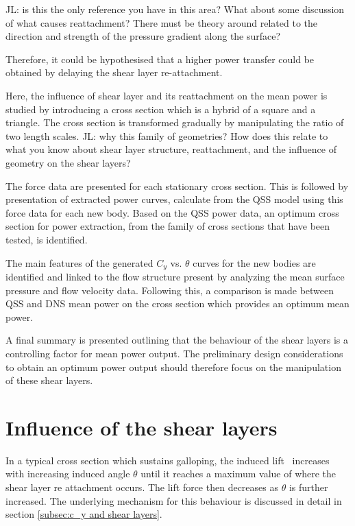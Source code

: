 JL: is this the only reference you have in this area? What about some discussion of what causes reattachment? There must be theory around related to the direction and strength of the pressure gradient along the surface?

Therefore, it could be hypothesised that a higher power transfer could be obtained by delaying the shear layer re-attachment. 

Here, the influence of shear layer and its reattachment on the mean power is studied by introducing a cross section which is a hybrid of a square and a triangle. The cross section is transformed gradually by manipulating the ratio of two length scales. JL: why this family of geometries? How does this relate to what you know about shear layer structure, reattachment, and the influence of geometry on the shear layers?

The force data are presented for each stationary cross section. This is followed by presentation of extracted power curves, calculate from the QSS model using this force data for each new body. Based on the QSS power data, an optimum cross section for power extraction, from the family of cross sections that have been tested, is identified.

The main features of the generated $C_y$ vs. $\theta$ curves for the
new bodies are identified and linked to the flow structure present by
analyzing the mean surface pressure and flow velocity data. Following
this, a comparison is made between QSS and DNS mean power on the cross
section which provides an optimum mean power.

A final summary is presented outlining that the behaviour of the shear layers is a controlling factor for mean power output. The preliminary design considerations to obtain an optimum power output should therefore focus on the manipulation of these shear layers. 

\section{Influence of the shear layers}

In a typical cross section which sustains galloping, the induced lift \cy\ increases with increasing induced angle $\theta$ until it reaches a maximum value of \cy where the shear layer re attachment occurs. The lift force then decreases as $\theta$ is further increased. The underlying mechanism for this behaviour is discussed in detail in section \ref{subsec:c_y and shear layers}.   

